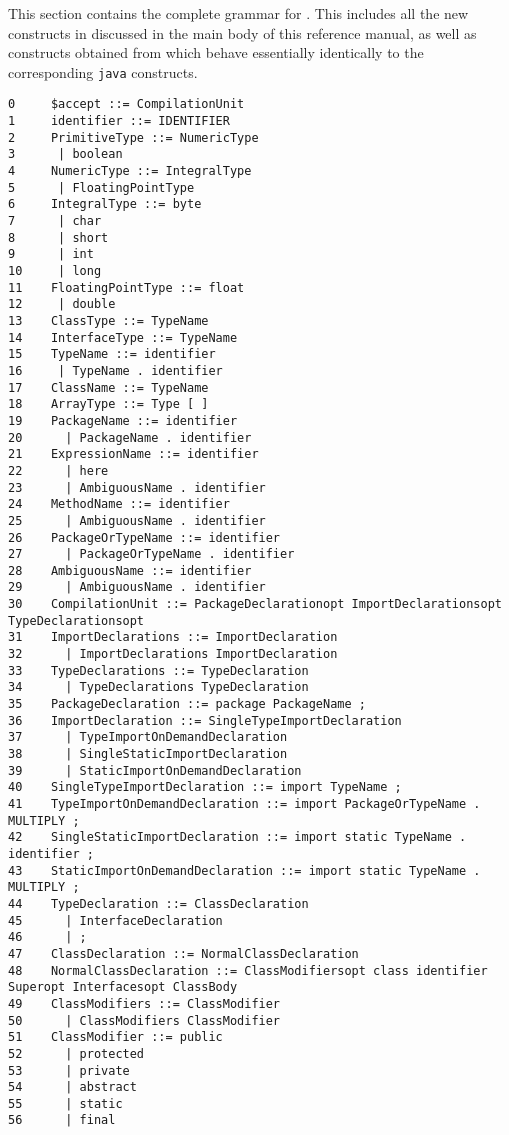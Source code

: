 \onecolumn
{}\label{X10 syntax}

This section contains the complete grammar for \Xten{}. This includes
all the new constructs in \Xten{} discussed in the main body of this
reference manual, as well as constructs obtained from \java{} which
behave essentially identically to the corresponding {\tt java} constructs.

{\footnotesize
\begin{verbatim}
0     $accept ::= CompilationUnit
1     identifier ::= IDENTIFIER
2     PrimitiveType ::= NumericType
3      | boolean
4     NumericType ::= IntegralType
5      | FloatingPointType
6     IntegralType ::= byte
7      | char
8      | short
9      | int
10     | long
11    FloatingPointType ::= float
12     | double
13    ClassType ::= TypeName
14    InterfaceType ::= TypeName
15    TypeName ::= identifier
16     | TypeName . identifier
17    ClassName ::= TypeName
18    ArrayType ::= Type [ ]
19    PackageName ::= identifier
20      | PackageName . identifier
21    ExpressionName ::= identifier
22      | here
23      | AmbiguousName . identifier
24    MethodName ::= identifier
25      | AmbiguousName . identifier
26    PackageOrTypeName ::= identifier
27      | PackageOrTypeName . identifier
28    AmbiguousName ::= identifier
29      | AmbiguousName . identifier
30    CompilationUnit ::= PackageDeclarationopt ImportDeclarationsopt TypeDeclarationsopt
31    ImportDeclarations ::= ImportDeclaration
32      | ImportDeclarations ImportDeclaration
33    TypeDeclarations ::= TypeDeclaration
34      | TypeDeclarations TypeDeclaration
35    PackageDeclaration ::= package PackageName ;
36    ImportDeclaration ::= SingleTypeImportDeclaration
37      | TypeImportOnDemandDeclaration
38      | SingleStaticImportDeclaration
39      | StaticImportOnDemandDeclaration
40    SingleTypeImportDeclaration ::= import TypeName ;
41    TypeImportOnDemandDeclaration ::= import PackageOrTypeName . MULTIPLY ;
42    SingleStaticImportDeclaration ::= import static TypeName . identifier ;
43    StaticImportOnDemandDeclaration ::= import static TypeName . MULTIPLY ;
44    TypeDeclaration ::= ClassDeclaration
45      | InterfaceDeclaration
46      | ;
47    ClassDeclaration ::= NormalClassDeclaration
48    NormalClassDeclaration ::= ClassModifiersopt class identifier Superopt Interfacesopt ClassBody
49    ClassModifiers ::= ClassModifier
50      | ClassModifiers ClassModifier
51    ClassModifier ::= public
52      | protected
53      | private
54      | abstract
55      | static
56      | final

\end{verbatim}}
